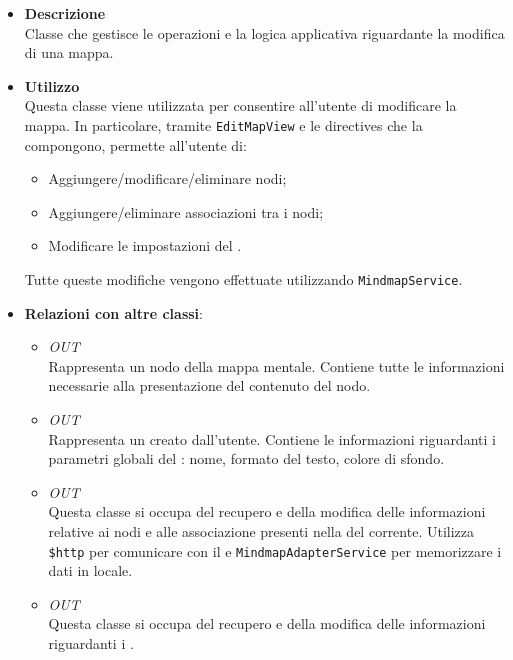 \begin{itemize}
\item \textbf{Descrizione}\\
Classe che gestisce le operazioni e la logica applicativa riguardante la modifica di una mappa.
\item \textbf{Utilizzo}\\
Questa classe viene utilizzata per consentire all’utente di modificare la mappa. In particolare, tramite \texttt{EditMapView} e le directives che la compongono, permette all’utente di:
\begin{itemize}
\item Aggiungere/modificare/eliminare nodi;
\item Aggiungere/eliminare associazioni tra i nodi;
\item Modificare le impostazioni del .
\end{itemize}
Tutte queste modifiche vengono effettuate utilizzando \texttt{MindmapService}.
\item \textbf{Relazioni con altre classi}:
\begin{itemize}
\item \textit{OUT} \hyperref[\nogloxy{Premi::Front-End::Model::Node}]{}\\
Rappresenta un nodo della mappa mentale. Contiene tutte le informazioni necessarie alla presentazione del contenuto del nodo.
\item \textit{OUT} \hyperref[\nogloxy{Premi::Front-End::Model::Project}]{}\\
Rappresenta un  creato dall’utente. Contiene le informazioni riguardanti i parametri globali del : nome, formato del testo, colore di sfondo.
\item \textit{OUT} \hyperref[\nogloxy{Premi::Front-End::Services::MindmapService}]{}\\
Questa classe si occupa del recupero e della modifica delle informazioni relative ai nodi e alle associazione presenti nella  del  corrente. Utilizza \texttt{\$http} per comunicare con il  e \texttt{MindmapAdapterService} per memorizzare i dati in locale.
\item \textit{OUT} \hyperref[\nogloxy{Premi::Front-End::Services::ProjectService}]{}\\
Questa classe si occupa del recupero e della modifica delle informazioni riguardanti i .

\end{itemize}
\end{itemize}
